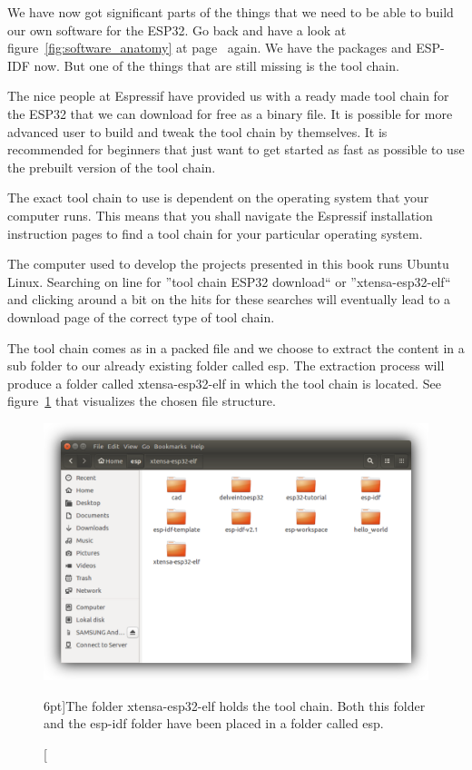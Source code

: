 \documentclass{tufte-book}
\begin{document}
We have now got significant parts of the things that we need to be able to build our own software for the ESP32. Go back and have a look at figure~\ref{fig:software_anatomy} at page~\pageref{fig:software_anatomy} again. We have the packages and ESP-IDF now. But one of the things that are still missing is the tool chain.

The nice people at Espressif have provided us with a ready made tool chain for the ESP32 that we can download for free as a binary file. It is possible for more advanced user to build and tweak the tool chain by themselves. It is recommended for beginners that just want to get started as fast as possible to use the prebuilt version of the tool chain.

The exact tool chain to use is dependent on the operating system that your computer runs. This means that you shall navigate the Espressif installation instruction pages to find a tool chain for your particular operating system.


The computer used to develop the projects presented in this book runs Ubuntu Linux. Searching on line for ''tool chain ESP32 download`` or ''xtensa-esp32-elf`` and clicking around a bit on the hits for these searches will eventually lead to a download page of the correct type of tool chain.

The tool chain comes as in a packed file and we choose to extract the content in a sub folder to our already existing folder called esp. The extraction process will produce a folder called xtensa-esp32-elf in which the tool chain is located. See figure~\ref{fig:tool_chain_folder_shadowed} that visualizes the chosen file structure.

\begin{figure}
	\includegraphics{tool_chain_folder_shadowed.png}
	\caption[ $n$.][6pt]{The folder xtensa-esp32-elf holds the tool chain. Both this folder and the esp-idf folder have been placed in a folder called esp.}
	\label{fig:tool_chain_folder_shadowed}
\end{figure}
\end{document}
